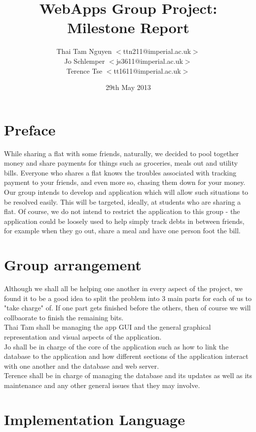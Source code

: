 \documentclass[a4paper,9t]{article}
\begin{document}
\title{WebApps Group Project: Milestone Report} \date{29th May
  2013} \author{
  Thai Tam Nguyen $<$ttn211@imperial.ac.uk$>$\\
  Jo Schlemper $<$js3611@imperial.ac.uk$>$\\
  Terence Tse  $<$tt1611@imperial.ac.uk$>$ }
\maketitle
\newpage
\section*{Preface}
While sharing a flat with some friends, naturally, we decided to pool together money and share payments for things such as groceries, meals out and utility bills. Everyone who shares a flat knows the troubles associated with tracking payment to your friends, and even more so, chasing them down for your money. Our group intends to develop and application which will allow such situations to be resolved easily. This will be targeted, ideally, at students who are sharing a flat. Of course, we do not intend to restrict the application to this group - the application could be loosely used to help simply track debts in between friends, for example when they go out, share a meal and have one person foot the bill.

\section*{Group arrangement}
Although we shall all be helping one another in every aspect of the project, we found it to be a good idea to split the problem into 3 main parts for each of us to "take charge" of. If one part gets finished before the others, then of course we will collbaorate to finish the remaining bits.\\ 
Thai Tam shall be managing the app GUI and the general graphical representation and visual aspects of the application.\\
Jo shall be in charge of the core of the application such as how to link the database to the application and how different sections of the application interact with one another and the database and web server.\\
Terence shall be in charge of managing the database and its updates as well as its maintenance and any other general issues that they may involve.

\section*{Implementation Language}
\end{document}
